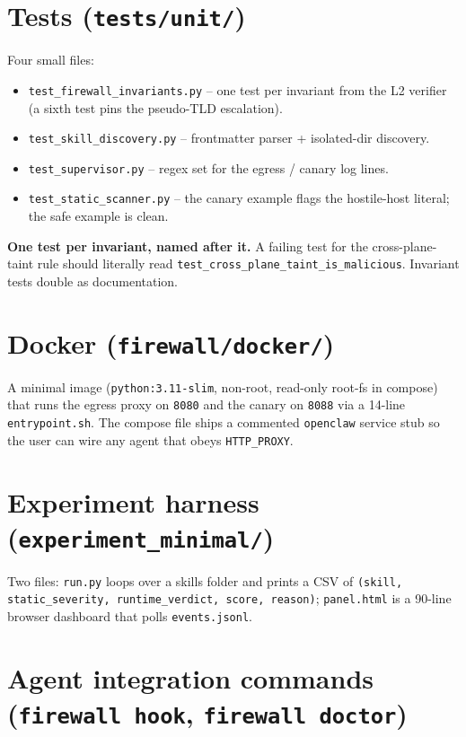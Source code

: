 \documentclass[11pt,a4paper]{article}
\begin{document}
\section{Tests (\texttt{tests/unit/})}

Four small files:
\begin{itemize}
  \item \texttt{test\_firewall\_invariants.py} -- one test per
    invariant from the L2 verifier (a sixth test pins the
    pseudo-TLD escalation).
  \item \texttt{test\_skill\_discovery.py} -- frontmatter parser +
    isolated-dir discovery.
  \item \texttt{test\_supervisor.py} -- regex set for the egress /
    canary log lines.
  \item \texttt{test\_static\_scanner.py} -- the canary example flags
    the hostile-host literal; the safe example is clean.
\end{itemize}

\begin{tip}
\textbf{One test per invariant, named after it.} A failing test for the
cross-plane-taint rule should literally read
\texttt{test\_cross\_plane\_taint\_is\_malicious}. Invariant tests double
as documentation.
\end{tip}

\section{Docker (\texttt{firewall/docker/})}

A minimal image (\texttt{python:3.11-slim}, non-root, read-only
root-fs in compose) that runs the egress proxy on \texttt{8080} and
the canary on \texttt{8088} via a 14-line \texttt{entrypoint.sh}. The
compose file ships a commented \texttt{openclaw} service stub so the
user can wire any agent that obeys \texttt{HTTP\_PROXY}.

\section{Experiment harness (\texttt{experiment\_minimal/})}

Two files: \texttt{run.py} loops over a skills folder and prints a CSV
of \texttt{(skill, static\_severity, runtime\_verdict, score, reason)};
\texttt{panel.html} is a 90-line browser dashboard that polls
\texttt{events.jsonl}.

\section{Agent integration commands (\texttt{firewall hook}, \texttt{firewall doctor})}
\end{document}
